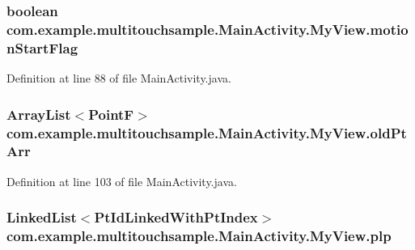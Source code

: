 \subsubsection[{motion\+Start\+Flag}]{\setlength{\rightskip}{0pt plus 5cm}boolean com.\+example.\+multitouchsample.\+Main\+Activity.\+My\+View.\+motion\+Start\+Flag\hspace{0.3cm}{\ttfamily [private]}}\label{classcom_1_1example_1_1multitouchsample_1_1_main_activity_1_1_my_view_ab1da26ed65817fe5db4d0be4892ac4b2}


Definition at line 88 of file Main\+Activity.\+java.

\hypertarget{classcom_1_1example_1_1multitouchsample_1_1_main_activity_1_1_my_view_abf78b5272ae2cffeed639bd024d2a642}{}
\subsubsection[{old\+Pt\+Arr}]{\setlength{\rightskip}{0pt plus 5cm}Array\+List$<$Point\+F$>$ com.\+example.\+multitouchsample.\+Main\+Activity.\+My\+View.\+old\+Pt\+Arr\hspace{0.3cm}{\ttfamily [private]}}\label{classcom_1_1example_1_1multitouchsample_1_1_main_activity_1_1_my_view_abf78b5272ae2cffeed639bd024d2a642}


Definition at line 103 of file Main\+Activity.\+java.

\hypertarget{classcom_1_1example_1_1multitouchsample_1_1_main_activity_1_1_my_view_a594a2fb9e001c0cfa1aa538c903bc3f8}{}
\subsubsection[{plp}]{\setlength{\rightskip}{0pt plus 5cm}Linked\+List$<${\bf Pt\+Id\+Linked\+With\+Pt\+Index}$>$ com.\+example.\+multitouchsample.\+Main\+Activity.\+My\+View.\+plp\hspace{0.3cm}{\ttfamily [private]}}\label{classcom_1_1example_1_1multitouchsample_1_1_main_activity_1_1_my_view_a594a2fb9e001c0cfa1aa538c903bc3f8}


